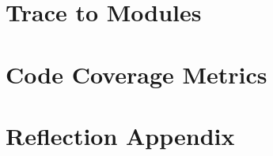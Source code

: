 \documentclass[12pt, titlepage]{article}
\begin{document}
\section{Trace to Modules}		

\section{Code Coverage Metrics}

\appendix
\section{Reflection Appendix}





\end{document}
